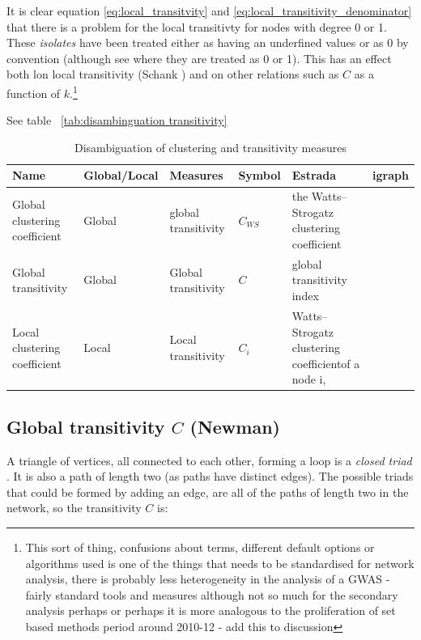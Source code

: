 It is clear equation \ref{eq:local_transitvity} and \ref{eq:local_transitivity_denominator} that there is a problem for the local transitivty for nodes with degree 0 or 1. These \textit{isolates} have been treated either as having an underfined values or as 0 by convention (although see \cite{schank2005approximating} where they are treated as 0 or 1). This has an effect both lon local transitivity (Schank \cite{schank2005approximating}) and on other relations such as $C$ as a function of $k$.\footnote{This sort of thing, confusions about terms, different default options or algorithms used is one of the things that needs to be standardised for network analysis, there is probably less heterogeneity in the analysis of a GWAS - fairly standard tools and measures although not so much for the secondary analysis perhaps or perhaps it is more analogous to the proliferation of set based methods period around 2010-12 - add this to discussion}

See table ~\ref{tab:disambinguation transitivity}

\begin{table}[]
    \centering
    \begin{adjustbox}{width=\textwidth}
   
    \begin{tabular}{llllll}
       Name  & Global/Local & Measures & Symbol & Estrada & igraph  \\
       \toprule
        Global clustering coefficient & Global & global transitivity & $C_{WS}$ & {the Watts–Strogatz clustering coefficient} & \\
        \midrule
        Global transitivity & Global & Global transitivity & $C$ & global transitivity index & \\
        Local clustering coefficient & Local & Local transitivity & $C_i$ & Watts–Strogatz clustering coefficientof a node i,&\\
        \bottomrule
    \end{tabular}
     \end{adjustbox}
    \caption{Disambiguation of clustering and transitivity measures}
    \label{tab:disambiguation transitivity}
\end{table}


\subsection{Global transitivity $C$ (Newman)}
\label{sec:global transitivity newman}
A triangle of vertices,  all connected to each other, forming a loop is  a \textit{closed triad} \cite{newman2018networks}.
It is also a path of length two (as paths have distinct edges). The possible triads that could be formed by adding an edge, are all of the paths of length two in the network, so the transitivity $C$ is:

